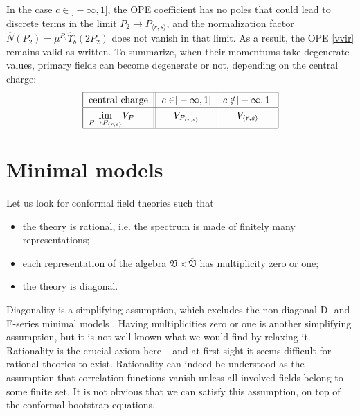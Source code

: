 \documentclass[12pt, a4paper, notitlepage, twoside]{report}
\numberwithin{equation}{section}
\theoremstyle{break}
\begin{document}
In the case $c\in]-\infty, 1]$, the OPE coefficient has no poles that could lead to discrete terms in the limit $P_2\to P_{\langle r,s\rangle}$, and the normalization factor $\hat N(P_2) = \mu^{P_2}\hat\Upsilon_b(2P_2)$ does not vanish in that limit. As a result, the OPE \eqref{vvir} remains valid as written. To summarize, when their momentums take degenerate values, primary fields can become degenerate or not, depending on the central charge:
\begin{align}
\renewcommand{\arraystretch}{1.3}
 \begin{tabular}{|l||c|c|}
  \hline
  central charge &  $c\in ]-\infty, 1]$ & $c\notin ]-\infty, 1]$
  \\
  \hline
  $\underset{P\to P_{\langle r,s \rangle}}{\lim } V_P$ & $ V_{P_{\langle r,s \rangle}}$  & $V_{\langle r,s \rangle}$ 
  \\
  \hline
 \end{tabular}
 \label{cicni}
\end{align}



\section{Minimal models \label{secvmm}}


Let us look for conformal field theories such that
\begin{itemize}
\item the theory is rational, i.e.
the spectrum is made of finitely many representations;
\item each representation of the algebra $\mathfrak{V}\times \overline{\mathfrak{V}}$ has multiplicity zero or one;
\item the theory is diagonal.
\end{itemize}
Diagonality is a simplifying assumption, which excludes the non-diagonal D- and E-series minimal models \cite{fms97}.
Having multiplicities zero or one is another simplifying assumption, but it is not well-known what we would find by relaxing it. 
Rationality is the crucial axiom here -- and at first sight it seems difficult for rational theories to exist.
Rationality can indeed be understood as the assumption that correlation functions vanish unless all involved fields belong to some finite set.
It is not obvious that we can satisfy this assumption, on top of the conformal bootstrap equations.
\end{document}
